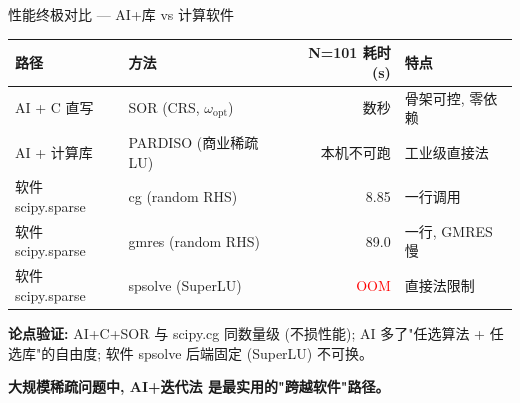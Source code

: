 \documentclass[12pt,aspectratio=169]{beamer}
\begin{document}
\begin{frame}[shrink]{性能终极对比 — AI+库 vs 计算软件}

\footnotesize
\begin{center}
\renewcommand{\arraystretch}{1.2}
\setlength{\tabcolsep}{6pt}
\begin{tabular}{@{}l l r l@{}}
\toprule
\textbf{路径} & \textbf{方法} & \textbf{N=101 耗时 (s)} & \textbf{特点} \\
\midrule
AI + C 直写       & SOR (CRS, $\omega_{\text{opt}}$) & 数秒          & 骨架可控, 零依赖 \\
AI + 计算库       & PARDISO (商业稀疏 LU)            & 本机不可跑    & 工业级直接法 \\
软件 scipy.sparse & cg (random RHS)                  & 8.85         & 一行调用 \\
软件 scipy.sparse & gmres (random RHS)               & 89.0         & 一行, GMRES 慢 \\
软件 scipy.sparse & spsolve (SuperLU)                & \textcolor{red}{OOM} & 直接法限制 \\
\bottomrule
\end{tabular}
\end{center}
\normalsize

\vspace{4pt}
\footnotesize \textbf{论点验证:} AI+C+SOR 与 scipy.cg 同数量级 (不损性能);
AI 多了"任选算法 + 任选库"的自由度; 软件 spsolve 后端固定 (SuperLU) 不可换。
\normalsize

\vspace{2pt}
\begin{center}
\small \textbf{大规模稀疏问题中, AI+迭代法 是最实用的"跨越软件"路径。}
\end{center}
\end{frame}
\end{document}
